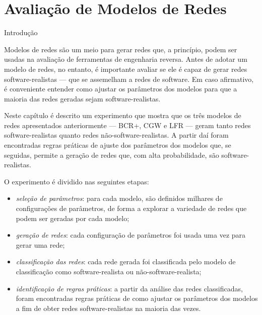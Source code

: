 \chapter{Avaliação de Modelos de Redes} \label{cap:avaliacao}

\begin{section}{Introdução}

	Modelos de redes são um meio para gerar redes que, a princípio, podem ser usadas na avaliação de ferramentas de engenharia reversa. Antes de adotar um modelo de redes, no entanto, é importante avaliar se ele é capaz de gerar redes software-realistas --- que se assemelham a redes de software. Em caso afirmativo, é conveniente entender como ajustar os parâmetros dos modelos para que a maioria das redes geradas sejam software-realistas.

	Neste capítulo é descrito um experimento que mostra que os três modelos de redes apresentados anteriormente --- BCR+, CGW e LFR --- geram tanto redes software-realistas quanto redes não-software-realistas. A partir daí foram encontradas regras práticas de ajuste dos parâmetros dos modelos que, se seguidas, permite a geração de redes que, com alta probabilidade, são software-realistas.
	
	O experimento é dividido nas seguintes etapas:
	
	\begin{itemize}
		\item \emph{seleção de parâmetros}: para cada modelo, são definidos milhares de configurações de parâmetros, de forma a explorar a variedade de redes que podem ser geradas por cada modelo;
		\item \emph{geração de redes}: cada configuração de parâmetros foi usada uma vez para gerar uma rede;
		\item \emph{classificação das redes}: cada rede gerada foi classificada pelo modelo de classificação como software-realista ou não-software-realista;
		\item \emph{identificação de regras práticas}: a partir da análise das redes classificadas, foram encontradas regras práticas de como ajustar os parâmetros dos modelos a fim de obter redes software-realistas na maioria das vezes.
	\end{itemize}

\end{section}

